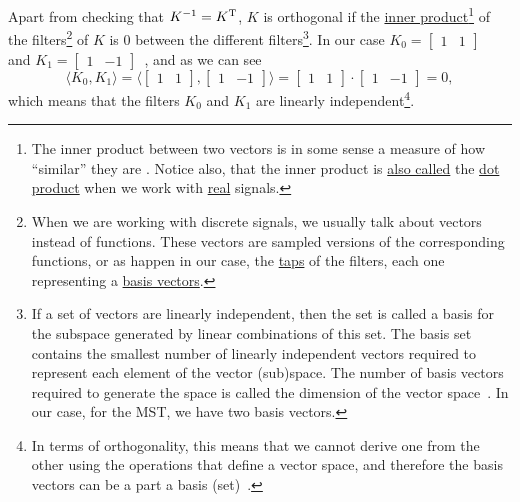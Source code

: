 Apart from checking that $K^{-1}=K^{\text T}$, $K$ is orthogonal if
the \href{https://en.wikipedia.org/wiki/Inner_product_space}{inner
  product}\footnote{The inner product between two vectors is in some
  sense a measure of how ``similar'' they are
  \cite{sayood2017introduction}. Notice also, that the inner product
  is
  \href{https://math.stackexchange.com/questions/476738/difference-between-dot-product-and-inner-product}{also
    called} the \href{https://en.wikipedia.org/wiki/Dot_product}{dot
    product} when we work with
  \href{https://en.wikipedia.org/wiki/Real_number}{real} signals.} of
the filters\footnote{When we are working with discrete signals, we
  usually talk about vectors instead of functions. These vectors are
  sampled versions of the corresponding functions, or as happen in our
  case, the \href{https://en.wikipedia.org/wiki/Finite_impulse_response}{taps} of the filters, each one representing a
  \href{https://en.wikipedia.org/wiki/Basis_(linear_algebra)}{basis
    vectors}.} of $K$ is $0$ between the different filters\footnote{If
  a set of vectors are linearly independent, then the set is called a
  basis for the subspace generated by linear combinations of this
  set. The basis set contains the smallest number of linearly
  independent vectors required to represent each element of the vector
  (sub)space. The number of basis vectors required to generate the
  space is called the dimension of the vector
  space~\cite{sayood2017introduction}. In our case, for the MST, we
  have two basis vectors.}. In our case
$K_0=\begin{bmatrix}1 & 1\end{bmatrix}$~ and
$K_1=\begin{bmatrix} 1 & -1\end{bmatrix}$~, and as we can see
\begin{equation}
  \langle K_0,K_1 \rangle =
  \langle \begin{bmatrix}
    1 & 1
  \end{bmatrix}
  ,
  \begin{bmatrix}
    1 & -1
  \end{bmatrix}
  \rangle =
  \begin{bmatrix}
    1 & 1
  \end{bmatrix}
  \cdot
  \begin{bmatrix}
    1 & -1
  \end{bmatrix}
   = 0,
\end{equation}
which means that the filters $K_0$ and $K_1$ are linearly
independent\footnote{In terms of orthogonality, this means that we
  cannot derive one from the other using the operations that define a
  vector space, and therefore the basis vectors can be a part a basis
  (set)~\cite{strang4linear}.}.

